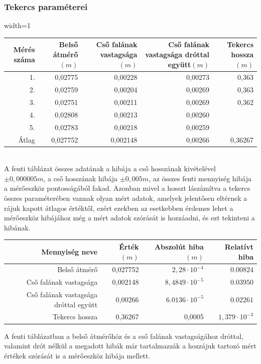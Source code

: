 \documentclass[10pt,pdftex]{report}
\begin{document}
\subsubsection{Tekercs paraméterei}
\begin{centering}
    \centering
    \begin{adjustbox}{width=1\textwidth}
    \begin{tabular}{|r|r|r|r|r|}
        \hline
        Mérés száma & Belső átmérő$(m)$ & Cső falának vastagsága$(m)$ & Cső falának vastagsága dróttal együtt$(m)$ & Tekercs hossza$(m)$ \\
        \hline
        1. & 0,02775 & 0,00228 & 0,00273 & 0,363 \\
        \hline
        2. & 0,02759 & 0,00204 & 0,00269 & 0,363 \\
        \hline
        3. & 0,02751 & 0,00211 & 0,00269 & 0,362 \\
        \hline
        4. & 0,02808 & 0,00213 & 0,00260 & \\
        \hline
        5. & 0,02783 & 0,00218 & 0,00259 & \\
        \hline
        Átlag & 0,027752 & 0,002148 & 0,00266 & 0,36267 \\
        \hline
    \end{tabular}
    \end{adjustbox}
\end{centering}\\
\newline
A fenti táblázat összes adatának a hibája a cső hosszának kivételével $\pm0,000005m$, a cső hosszának hibája $\pm0,005m$, az összes fenti mennyiség hibája a mérőeszköz 
pontosságából fakad. Azonban mivel a hosszt lászámítva a tekercs összes paraméterében vannak olyan mért adatok, amelyek jelentősen eltérnek a rájuk kapott átlagos 
értéktől, ezért ezekben az esetkebben érdemes lehet a mérőeszköz hibájához még a mért adatok szórását is hozzáadni, és ezt tekinteni a hibának.
\newline
\newline
\newline
\begin{centering}
    \centering
    \begin{tabular}{|r|r|r|r|}
        \hline
        Mennyiség neve & Érték$(m)$ & Abszolút hiba$(m)$ & Relatívt hiba\\
        \hline
        Belső átmérő & 0,027752 & $2,28\cdot 10^{-4}$ & $0.00824$\\
        \hline
        Cső falának vastagsága & 0,002148 & $8,4849\cdot 10^{-5}$ & $0.03950$\\
        \hline
        Cső falának vastagsága dróttal együtt & 0,00266 & $6.0136\cdot 10^{-5}$ & $0.02261$\\
        \hline
        Tekercs hossza & 0,36267 & 0,0005 & $1,379\cdot 10^{-3}$ \\
        \hline
    \end{tabular}
\end{centering}
\newline A fenti táblázatban  a belső átmérőhöz és a cső falának vastagságához dróttal, valamint drót nélkül a megadott hibák már tartalmazzák a hozzájuk tartozó mért értékek szórását is 
a mérőeszköz hibája mellett.
\end{document}
